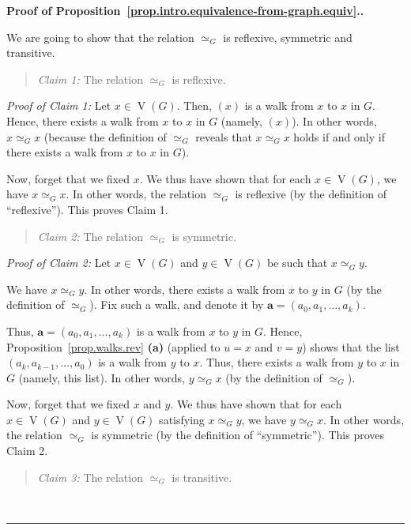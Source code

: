 \documentclass[numbers=enddot,12pt,final,onecolumn,notitlepage]{scrartcl}%
\theoremstyle{definition}
\newenvironment{statement}{\begin{quote}}{\end{quote}}
\newenvironment{proof}[1][Proof]{\noindent\textbf{#1.} }{\ \rule{0.5em}{0.5em}}
\newcommand{\tup}[1]{\left( #1 \right)}
\newcommand{\verts}[1]{\operatorname{V}\left( #1 \right)}
\begin{document}
\begin{proof}[Proof of
Proposition~\ref{prop.intro.equivalence-from-graph.equiv}.]

We are going to show that the relation $\simeq_G$ is reflexive,
symmetric and transitive.

\begin{statement}
\textit{Claim 1:} The relation $\simeq_G$ is reflexive.
\end{statement}

\textit{Proof of Claim 1:} Let
$x \in \verts{G}$. Then, $\tup{x}$ is a walk from $x$ to $x$ in $G$.
Hence, there exists a walk from $x$ to $x$ in $G$ (namely,
$\tup{x}$). In other words, $x \simeq_G x$ (because the definition of
$\simeq_G$ reveals that $x \simeq_G x$ holds if and only if there
exists a walk from $x$ to $x$ in $G$).

Now, forget that we fixed $x$. We thus have shown that for each
$x \in \verts{G}$, we have $x \simeq_G x$. In other words, the
relation $\simeq_G$ is reflexive (by the definition of ``reflexive'').
This proves Claim 1.

\begin{statement}
\textit{Claim 2:} The relation $\simeq_G$ is symmetric.
\end{statement}

\textit{Proof of Claim 2:} Let $x \in \verts{G}$ and $y \in \verts{G}$
be such that $x \simeq_G y$.

We have $x \simeq_G y$. In other words, there exists a walk from $x$
to $y$ in $G$ (by the definition of $\simeq_G$). Fix such a walk, and
denote it by $\mathbf{a} = \tup{a_0, a_1, \ldots, a_k}$.

Thus, $\mathbf{a} = \tup{a_0, a_1, \ldots, a_k}$ is a walk from $x$
to $y$ in $G$.
Hence, Proposition~\ref{prop.walks.rev} \textbf{(a)} (applied to
$u = x$ and $v = y$) shows that the list
$\tup{a_k, a_{k-1}, \ldots, a_0}$ is a walk from $y$ to $x$. Thus,
there exists a walk from $y$ to $x$ in $G$ (namely, this list). In
other words, $y \simeq_G x$ (by the definition of $\simeq_G$).

Now, forget that we fixed $x$ and $y$. We thus have shown that for
each $x \in \verts{G}$ and $y \in \verts{G}$ satisfying
$x \simeq_G y$, we have $y \simeq_G x$. In other words, the
relation $\simeq_G$ is symmetric (by the definition of ``symmetric'').
This proves Claim 2.

\begin{statement}
\textit{Claim 3:} The relation $\simeq_G$ is transitive.
\end{statement}


\end{proof}
\end{document}
